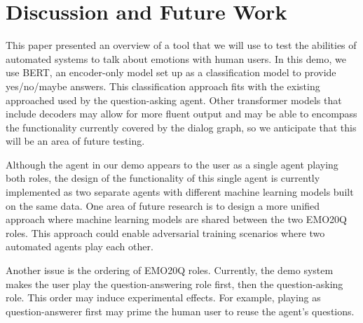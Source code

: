 \documentclass[conference]{IEEEtran}
\begin{document}
\section{Discussion and Future Work}

This paper presented an overview of a tool that we will use to test
the abilities of automated systems to talk about emotions with human
users.  In this demo, we use BERT, an encoder-only model set up as a
classification model to provide yes/no/maybe answers.  This
classification approach fits with the existing approached used by the
question-asking agent. Other transformer models that include decoders
may allow for more fluent output and may be able to encompass the
functionality currently covered by the dialog graph,  so we anticipate
that this will be an area of future testing.

Although the agent in our demo appears to the user as a single agent
playing both roles, the design of the functionality of this single
agent is currently implemented as two separate agents with different
machine learning models built on the same data. One area of future
research is to design a more unified approach where machine learning
models are shared between the two EMO20Q roles.  This approach could
enable adversarial training scenarios where two automated agents play
each other.




Another issue is the ordering of EMO20Q roles.  Currently, the demo
system makes the user play the question-answering role first, then the
question-asking role. This order may induce experimental effects.  For
example, playing as question-answerer first may prime the human user
to reuse the agent's questions.

\end{document}
